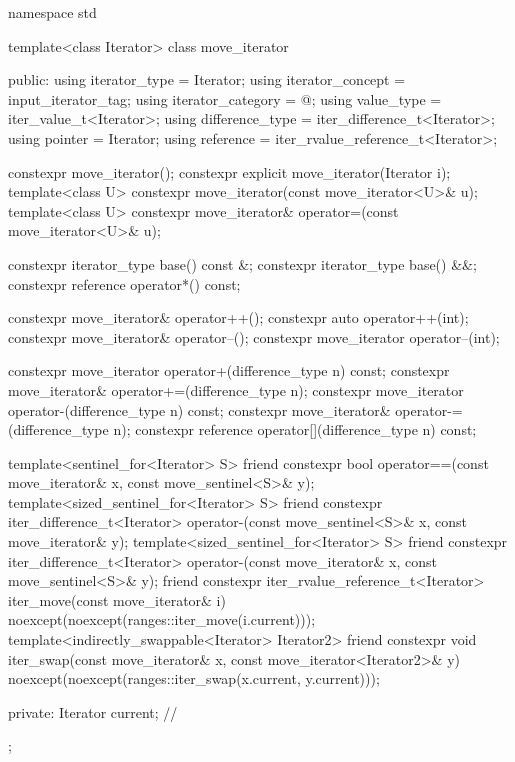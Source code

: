 %
\begin{codeblock}
namespace std {
  template<class Iterator>
  class move_iterator {
  public:
    using iterator_type     = Iterator;
    using iterator_concept  = input_iterator_tag;
    using iterator_category = @\seebelow@;
    using value_type        = iter_value_t<Iterator>;
    using difference_type   = iter_difference_t<Iterator>;
    using pointer           = Iterator;
    using reference         = iter_rvalue_reference_t<Iterator>;

    constexpr move_iterator();
    constexpr explicit move_iterator(Iterator i);
    template<class U> constexpr move_iterator(const move_iterator<U>& u);
    template<class U> constexpr move_iterator& operator=(const move_iterator<U>& u);

    constexpr iterator_type base() const &;
    constexpr iterator_type base() &&;
    constexpr reference operator*() const;

    constexpr move_iterator& operator++();
    constexpr auto operator++(int);
    constexpr move_iterator& operator--();
    constexpr move_iterator operator--(int);

    constexpr move_iterator operator+(difference_type n) const;
    constexpr move_iterator& operator+=(difference_type n);
    constexpr move_iterator operator-(difference_type n) const;
    constexpr move_iterator& operator-=(difference_type n);
    constexpr reference operator[](difference_type n) const;

    template<sentinel_for<Iterator> S>
      friend constexpr bool
        operator==(const move_iterator& x, const move_sentinel<S>& y);
    template<sized_sentinel_for<Iterator> S>
      friend constexpr iter_difference_t<Iterator>
        operator-(const move_sentinel<S>& x, const move_iterator& y);
    template<sized_sentinel_for<Iterator> S>
      friend constexpr iter_difference_t<Iterator>
        operator-(const move_iterator& x, const move_sentinel<S>& y);
    friend constexpr iter_rvalue_reference_t<Iterator>
      iter_move(const move_iterator& i)
        noexcept(noexcept(ranges::iter_move(i.current)));
    template<indirectly_swappable<Iterator> Iterator2>
      friend constexpr void
        iter_swap(const move_iterator& x, const move_iterator<Iterator2>& y)
          noexcept(noexcept(ranges::iter_swap(x.current, y.current)));

  private:
    Iterator current;   // \expos
  };
}
\end{codeblock}

